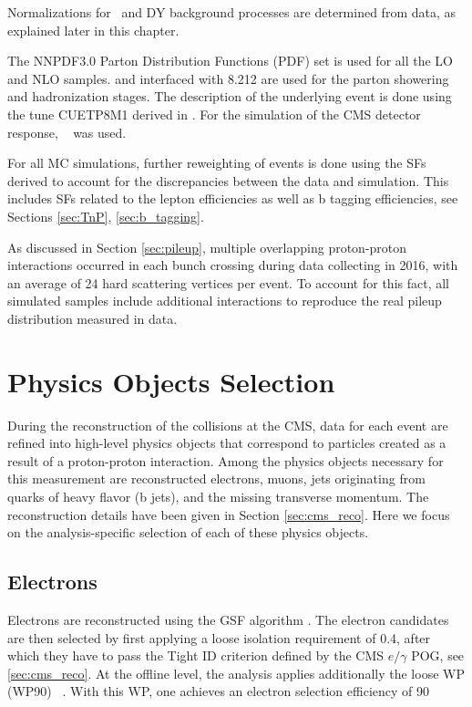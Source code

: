 Normalizations for \ttbar ~and DY background processes are determined from data, as explained later in this chapter.

The NNPDF3.0 \cite{Ball:2014uwa} Parton Distribution Functions
(PDF) set is used for all the LO and NLO samples. {\POWHEG} and {\MGMCatNLO} interfaced with
{\PYTHIA}8.212 are used for the parton
showering and hadronization stages. The description of the underlying event is done using the tune CUETP8M1 derived in \cite{Khachatryan:2015pea}. For the simulation of the CMS detector response, \GEANTfour~\cite{GEANT4} was used. 

For all MC simulations, further reweighting of events is done using the SFs derived to account for the discrepancies between the data and simulation. This includes SFs related to the lepton efficiencies as well as b tagging efficiencies, see Sections \ref{sec:TnP}, \ref{sec:b_tagging}.

As discussed in Section \ref{sec:pileup}, multiple overlapping proton-proton interactions occurred in each bunch crossing during data collecting in 2016, with an average of 24 hard scattering vertices per event. To account for this fact, all simulated samples include additional interactions to reproduce the real pileup distribution measured in data.

\section{Physics Objects Selection}
\label{sec:objects}


During the reconstruction of the collisions at the CMS, data for each event are refined into high-level physics objects that correspond to particles created as a result of a proton-proton interaction. Among the physics objects necessary for this measurement are reconstructed electrons, muons, jets originating from quarks of heavy flavor (b jets), and the missing transverse momentum. The reconstruction details have been given in Section \ref{sec:cms_reco}. Here we focus on the analysis-specific selection of each of these physics objects.

\subsection{Electrons}\label{sec:electrons}
Electrons are reconstructed using the GSF algorithm \cite{GSF}. The electron candidates are then selected by first applying a loose isolation requirement of 0.4, after which they have to pass the Tight ID criterion defined by the CMS $e/\gamma$ POG, see \ref{sec:cms_reco}. At the offline level, the analysis applies additionally the loose WP (WP90) ~\cite{vhbbAN}. With this WP, one achieves an electron selection efficiency of 90%

